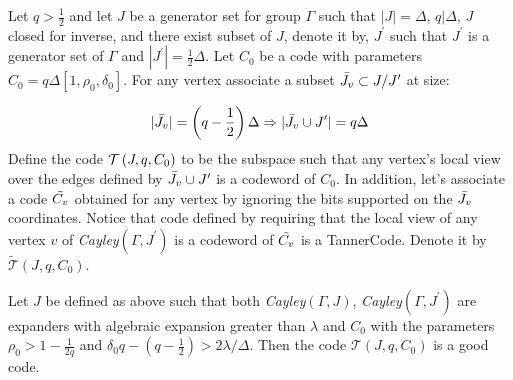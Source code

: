 \begin{definition}\label{testtaner} Let $q > \frac{1}{2}$ and let $J$ be a generator set for group $\Gamma$ such that $|J| = \Delta$, $q | \Delta $, $J$ closed for inverse, and there exist subset of $J$, denote it by, $J^{\prime}$ such that $J^{\prime}$ is a generator set of $\Gamma$ and $|J^{\prime}| = \frac{1}{2}\Delta$. Let $C_{0}$ be a code with parameters $C_{0} = q\Delta \left[1, \rho_{0}, \delta_{0}\right]$. For any vertex associate a subset $\bar{J_{v}} \subset J/J^{\prime}$ at size: 

  \begin{equation*}
    \begin{split}
      |\bar{J_{v}}| = \left( q - \frac{1}{2} \right)\Delta \Rightarrow |\bar{J_{v}} \cup J^{\prime}| = q\Delta
    \end{split}
  \end{equation*}
  Define the code $\mathcal{T}\left(J, q , C_{0}\right)$ to be the subspace such that any vertex's local view over the edges defined by $\bar{J_{v}} \cup J^{\prime}$ is a codeword of $C_{0}$. In addition, let's associate a code $\tilde{C_{v}}$ obtained for any vertex by ignoring the bits supported on the $\bar{J_{v}}$ coordinates. Notice that code defined by requiring that the local view of any vertex $v$ of \emph{Cayley}$\left(\Gamma, J^{\prime} \right)$ is a codeword of $\tilde{C_{v}}$ is a TannerCode. Denote it by $ \tilde{\mathcal{T}}\left(J, q ,C_{0}\right)$.   
\end{definition}
\begin{claim} Let $J$ be defined as above such that both \emph{Cayley}$\left( \Gamma, J \right)$, \emph{Cayley}$\left( \Gamma, J^{\prime} \right)$ are expanders with algebraic expansion greater than $\lambda$ and $C_0$ with the parameters $\rho_{0} > 1 - \frac{1}{2q}$ and $ \delta_{0}q - \left( q - \frac{1}{2} \right) > 2\lambda/\Delta$. Then the code $\mathcal{T}\left(J, q ,C_{0}\right)$ is a good code.\end{claim}
